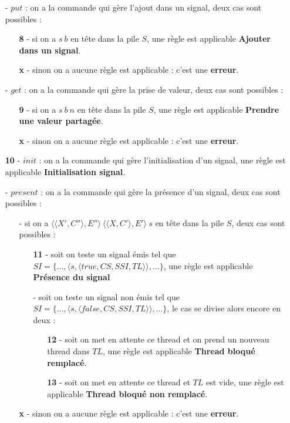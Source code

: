 \documentclass[10pt,a4paper]{report}
\begin{document}
\begin{enumerate}
		\item[-] $put$ : on a la commande qui gère l'ajout dans un signal, deux cas sont possibles :
		\begin{enumerate}
			\item[\textbf{8} -] si on a $s~b$ en tête dans la pile $S$, une règle est applicable \textbf{Ajouter dans un signal}.
			\item[\textbf{x} -] sinon on a aucune règle est applicable : c'est une \textbf{erreur}.
		\end{enumerate}
		\medbreak
		
		\item[-] $get$ : on a la commande qui gère la prise de valeur, deux cas sont possibles :
		\begin{enumerate}
			\item[\textbf{9} -] si on a $s~b~n$ en tête dans la pile $S$, une règle est applicable \textbf{Prendre une valeur partagée}.
			\item[\textbf{x} -] sinon on a aucune règle est applicable : c'est une \textbf{erreur}.
		\end{enumerate}
		\medbreak
		
		\item[\textbf{10} -] $init$ : on a la commande qui gère l'initialisation d'un signal, une règle est applicable \textbf{Initialisation signal}.
		\medbreak
		
		\item[-] $present$ : on a la commande qui gère la présence d'un signal, deux cas sont possibles :
		\begin{enumerate}
			\item[-] si on a $\langle\langle X',C''\rangle,E''\rangle~\langle\langle X,C'\rangle,E'\rangle~s$ en tête dans la pile $S$, deux cas sont possibles : 
			\begin{enumerate}
				\item[\textbf{11} -] soit on teste un signal émis tel que $SI = \{...,\langle s,\langle true,CS,SSI,TL\rangle\rangle,...\}$, une règle est applicable \textbf{Présence du signal}
				\item[-] soit on teste un signal non émis tel que $SI = \{...,\langle s,\langle false,CS,SSI,TL\rangle\rangle,...\}$, le cas se divise alors encore en deux :
				\begin{enumerate}
					\item[\textbf{12} -] soit on met en attente ce thread et on prend un nouveau thread dans $TL$, une règle est applicable \textbf{Thread bloqué remplacé}.
					\item[\textbf{13} -] soit on met en attente ce thread et $TL$ est vide, une règle est applicable \textbf{Thread bloqué non remplacé}.
				\end{enumerate}
			\end{enumerate}
			\item[\textbf{x} -] sinon on a aucune règle est applicable : c'est une \textbf{erreur}.
		\end{enumerate}
		\medbreak
		

\end{enumerate}
\end{document}
